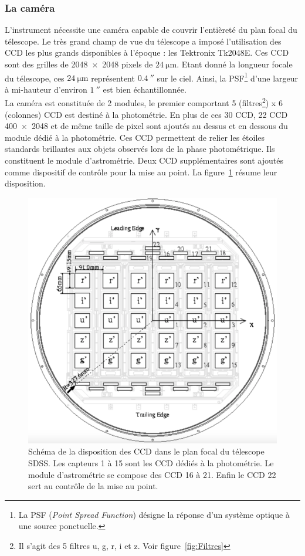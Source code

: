 \subsubsection{La caméra}
L'instrument nécessite une caméra \autocite{Gunn1998} capable de couvrir l'entièreté du plan focal du télescope. Le très grand champ de vue du télescope a imposé l'utilisation des CCD les plus grands disponibles à l'époque : les Tektronix Tk2048E. Ces CCD sont des grilles de \num{2048x2048} pixels de $\SI{24}{\micro\meter}$. Etant donné la longueur focale du télescope, ces $\SI{24}{\micro\meter}$ représentent $\SI{0,4}{\arcsecond}$ sur le ciel. Ainsi, la PSF\footnote{La PSF (\emph{Point Spread Function}) désigne la réponse d'un système optique à une source ponctuelle.} d'une largeur à mi-hauteur d'environ $\SI{1}{\arcsecond}$ est bien échantillonnée. \\
La caméra est constituée de 2 modules, le premier comportant 5 (filtres\footnote{Il s'agit des 5 filtres u, g, r, i et z. Voir figure~\ref{fig:Filtres}}) x 6 (colonnes) CCD est destiné à la photométrie. En plus de ces 30 CCD, 22 CCD \num{400x2048} et de même taille de pixel sont ajoutés au dessus et en dessous du module dédié à la photométrie. Ces CCD permettent de relier les étoiles standards brillantes aux objets observés lors de la phase photométrique. Ils constituent le module d'astrométrie. Deux CCD supplémentaires sont ajoutés comme dispositif de contrôle pour la mise au point. La figure~\ref{fig:CcdSchema} résume leur disposition.
\begin{figure}
  \centering
  \includegraphics[scale=0.3]{CcdSchema}
  \caption{Schéma de la disposition des CCD dans le plan focal du télescope SDSS. Les capteurs 1 à 15 sont les CCD dédiés à la photométrie. Le module d'astrométrie se compose des CCD 16 à 21. Enfin le CCD 22 sert au contrôle de la mise au point.}
  \label{fig:CcdSchema}
\end{figure}

